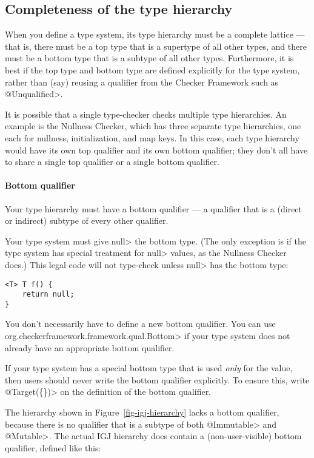 \subsection{Completeness of the type hierarchy\label{bottom-and-top-qualifier}}

When you define a type system, its type hierarchy must be a
complete lattice --- that is, there must be a top type that is a
supertype of all other types, and there must be a bottom type that is a
subtype of all other types.
Furthermore, it is best if the top type and bottom type are defined
explicitly for the type system, rather than (say) reusing a qualifier from the
Checker Framework such as \<@Unqualified>.

It is possible that a single type-checker checks multiple type hierarchies.
An example is the Nullness Checker, which has three separate type
hierarchies, one each for
nullness, initialization, and map keys.  In this case, each type hierarchy
would have its own top qualifier and its own bottom qualifier; they don't
all have to share a single top qualifier or a single bottom qualifier.


\paragraph{Bottom qualifier\label{bottom-qualifier}}
Your type hierarchy must have a bottom qualifier
--- a qualifier that is a (direct or indirect) subtype of every other
qualifier.

Your type system must give \<null> the bottom type.  (The only exception
is if the type system has special treatment for \<null> values, as the
Nullness Checker does.)  This legal code
will not type-check unless \<null> has the bottom type:
\begin{Verbatim}
<T> T f() {
    return null;
}
\end{Verbatim}

You don't necessarily have to define a new bottom qualifier.  You can
use \<org.checkerframework.framework.qual.Bottom> if your type system does not already have an
appropriate bottom qualifier.

If your type system has a special bottom type that is used \emph{only} for
the  value, then users should never write the bottom qualifier
explicitly.  To ensure this, write \<@Target(\{\})> on the definition of
the bottom qualifier.


The hierarchy shown in Figure~\ref{fig-igj-hierarchy} lacks
a bottom qualifier, because there is no qualifier that is a subtype of both
\<@Immutable> and \<@Mutable>.
The actual IGJ hierarchy does contain a (non-user-visible) bottom qualifier,
defined like this:

